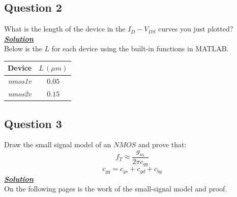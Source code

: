 \documentclass[12pt, fleqn]{article}
\begin{document}
\subsection{Question 2}
What is the length of the device in the $I_D - V_{DS}$ curves you just plotted?\\[0.5cm]
\underline{\textbf{\textit{Solution}}}\\[0.25cm]
Below is the $L$ for each device using the built-in functions in MATLAB.\\[0.25cm]
    \begin{table}[H]
    \centering
    \setlength{\tabcolsep}{20pt}
    \renewcommand{\arraystretch}{1.5}
        \begin{tabular}{|c|c|}
            \hline
            \textbf{Device} & $L\,(\mu m)$\\
            \hline
            \textit{nmos1v} & $0.05$\\
            \hline
            \textit{nmos2v} & $0.15$ \\
            \hline
        \end{tabular}
    \end{table}
\subsection{Question 3}
Draw the small signal model of an $NMOS$ and prove that:
\begin{equation}
    f_T \approx \frac{g_m}{2\pi c_{gg}}
\end{equation}
\begin{equation}
    c_{gg} = c_{gs} + c_{gd} + c_{bg}
\end{equation}
\underline{\textbf{\textit{Solution}}}\\[0.25cm]
On the following pages is the work of the small-signal model and proof.\\[0.25cm]

\newpage
\end{document}

